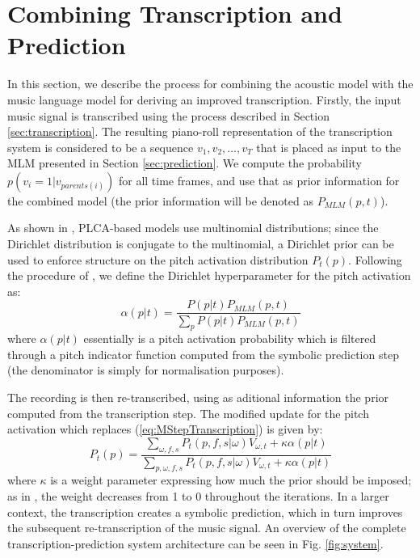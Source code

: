 \section{Combining Transcription and Prediction}
\label{sec:combination}


In this section, we describe the process for combining the acoustic model with the music language model for deriving an improved transcription. Firstly, the input music signal is transcribed using the process described in Section \ref{sec:transcription}. The resulting piano-roll representation of the transcription system is considered to be a sequence $v_1, v_2, \ldots, v_T$ that is placed as input to the MLM presented in Section \ref{sec:prediction}. We compute the probability $p(v_i=1|v_{parents(i)})$ for all time frames, and use that as prior information for the combined model (the prior information will be denoted as $P_{\mathit{MLM}}(p,t)$).

As shown in \cite{Smaragdis2009}, PLCA-based models use multinomial distributions; since the Dirichlet distribution is conjugate to the multinomial, a Dirichlet prior can be used to enforce structure on the pitch activation distribution $P_{t}(p)$. Following the procedure of \cite{Smaragdis2009}, we define the Dirichlet hyperparameter for the pitch activation as:
\begin{equation}
 \alpha(p|t) = \frac{P(p|t)P_{\mathit{MLM}}(p,t)}{\sum_{p}P(p|t)P_{\mathit{MLM}}(p,t)}
\end{equation}
where $\alpha(p|t)$ essentially is a pitch activation probability which is filtered through a pitch indicator function computed from the symbolic prediction step (the denominator is simply for normalisation purposes).

The recording is then re-transcribed, using as aditional information the prior computed from the transcription step. The modified update for the pitch activation which replaces (\ref{eq:MStepTranscription}) is given by:
\begin{equation}
 P_{t}(p) = \frac{\sum_{\omega,f,s}P_{t}(p,f,s|\omega)V_{\omega,t}+\kappa\alpha(p|t)}{\sum_{p,\omega,f,s}P_{t}(p,f,s|\omega)V_{\omega,t}+\kappa\alpha(p|t)} \label{eq:modifiedMStepPitchActivation}
\end{equation}
where $\kappa$ is a weight parameter expressing how much the prior should be imposed; as in \cite{Smaragdis2009}, the weight decreases from 1 to 0 throughout the iterations. In a larger context, the transcription creates a symbolic prediction, which in turn improves the subsequent re-transcription of the music signal. An overview of the complete transcription-prediction system architecture can be seen in Fig. \ref{fig:system}.

